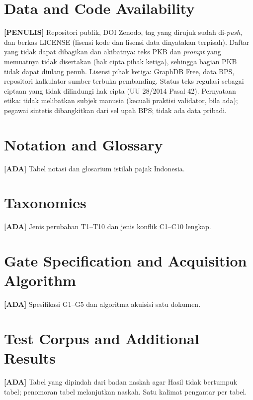 \documentclass{ieeeaccess}
\newcommand{\ADA}{\textcolor{stada}{\textbf{[ADA]}}}
\newcommand{\PENULIS}{\textcolor{stpenulis}{\textbf{[PENULIS]}}}
\newenvironment{isi}{\par\smallskip\footnotesize\color{draftblue}\noindent}{\par\smallskip\normalsize\color{black}}
\begin{document}
\section*{Data and Code Availability}
\begin{isi}
\PENULIS{} Repositori publik, DOI Zenodo, tag yang dirujuk sudah di-\textit{push}, dan berkas LICENSE (lisensi kode dan lisensi data dinyatakan terpisah). Daftar yang tidak dapat dibagikan dan akibatnya: teks PKB dan \textit{prompt} yang memuatnya tidak disertakan (hak cipta pihak ketiga), sehingga bagian PKB tidak dapat diulang penuh. Lisensi pihak ketiga: GraphDB Free, data BPS, repositori kalkulator sumber terbuka pembanding. Status teks regulasi sebagai ciptaan yang tidak dilindungi hak cipta (UU 28/2014 Pasal 42). Pernyataan etika: tidak melibatkan subjek manusia (kecuali praktisi validator, bila ada); pegawai sintetis dibangkitkan dari sel upah BPS; tidak ada data pribadi.
\end{isi}

\appendices
\section{Notation and Glossary}
\begin{isi}\ADA{} Tabel notasi dan glosarium istilah pajak Indonesia.\end{isi}
\section{Taxonomies}
\begin{isi}\ADA{} Jenis perubahan T1--T10 dan jenis konflik C1--C10 lengkap.\end{isi}
\section{Gate Specification and Acquisition Algorithm}
\begin{isi}\ADA{} Spesifikasi G1--G5 dan algoritma akuisisi satu dokumen.\end{isi}
\section{Test Corpus and Additional Results}
\begin{isi}\ADA{} Tabel yang dipindah dari badan naskah agar Hasil tidak bertumpuk tabel; penomoran tabel melanjutkan naskah. Satu kalimat pengantar per tabel.\end{isi}
\end{document}
